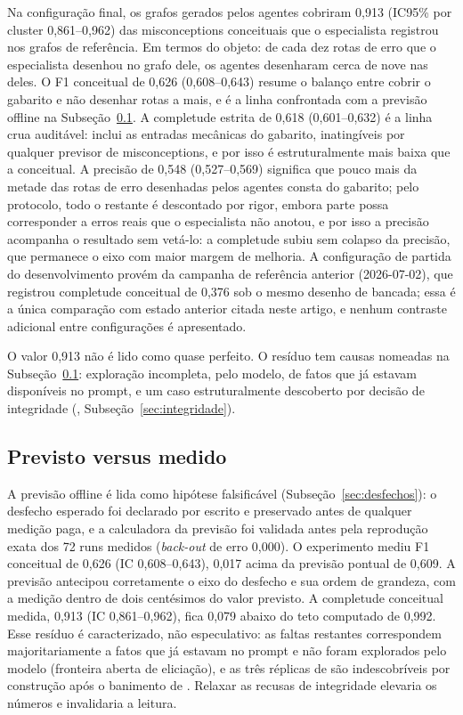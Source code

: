 \documentclass[11pt,a4paper]{article}
\begin{document}
Na configuração final, os grafos gerados pelos agentes cobriram 0,913 (IC95\% por cluster 0,861--0,962) das misconceptions conceituais que o especialista registrou nos grafos de referência. Em termos do objeto: de cada dez rotas de erro que o especialista desenhou no grafo dele, os agentes desenharam cerca de nove nas deles. O F1 conceitual de 0,626 (0,608--0,643) resume o balanço entre cobrir o gabarito e não desenhar rotas a mais, e é a linha confrontada com a previsão offline na Subseção~\ref{sec:previsto-medido}. A completude estrita de 0,618 (0,601--0,632) é a linha crua auditável: inclui as entradas mecânicas do gabarito, inatingíveis por qualquer previsor de misconceptions, e por isso é estruturalmente mais baixa que a conceitual. A precisão de 0,548 (0,527--0,569) significa que pouco mais da metade das rotas de erro desenhadas pelos agentes consta do gabarito; pelo protocolo, todo o restante é descontado por rigor, embora parte possa corresponder a erros reais que o especialista não anotou, e por isso a precisão acompanha o resultado sem vetá-lo: a completude subiu sem colapso da precisão, que permanece o eixo com maior margem de melhoria. A configuração de partida do desenvolvimento provém da campanha de referência anterior (2026-07-02), que registrou completude conceitual de 0,376 sob o mesmo desenho de bancada; essa é a única comparação com estado anterior citada neste artigo, e nenhum contraste adicional entre configurações é apresentado.

O valor 0,913 não é lido como quase perfeito. O resíduo tem causas nomeadas na Subseção~\ref{sec:previsto-medido}: exploração incompleta, pelo modelo, de fatos que já estavam disponíveis no prompt, e um caso estruturalmente descoberto por decisão de integridade (, Subseção~\ref{sec:integridade}).

\subsection{Previsto versus medido}
\label{sec:previsto-medido}

A previsão offline é lida como hipótese falsificável (Subseção~\ref{sec:desfechos}): o desfecho esperado foi declarado por escrito e preservado antes de qualquer medição paga, e a calculadora da previsão foi validada antes pela reprodução exata dos 72 runs medidos (\emph{back-out} de erro 0,000). O experimento mediu F1 conceitual de 0,626 (IC 0,608--0,643), 0,017 acima da previsão pontual de 0,609. A previsão antecipou corretamente o eixo do desfecho e sua ordem de grandeza, com a medição dentro de dois centésimos do valor previsto. A completude conceitual medida, 0,913 (IC 0,861--0,962), fica 0,079 abaixo do teto computado de 0,992. Esse resíduo é caracterizado, não especulativo: as faltas restantes correspondem majoritariamente a fatos que já estavam no prompt e não foram explorados pelo modelo (fronteira aberta de eliciação), e as três réplicas de  são indescobríveis por construção após o banimento de . Relaxar as recusas de integridade elevaria os números e invalidaria a leitura.
\end{document}
